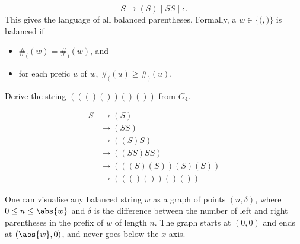 \begin{examples}
\[        S \to (S) \mid SS \mid \epsilon.
    \] This gives the language of all balanced parentheses.
    Formally, a $w \in \{\texttt{(}, \texttt{)}\}$ is balanced if
    \begin{itemize}
        \item $\#_((w) = \#_)(w)$, and
        \item for each prefic $u$ of $w$, $\#_((u) \ge \#_)(u)$.
    \end{itemize}
    \begin{exercise}
        Derive the string $((()())()())$ from $G_4$.
    \end{exercise}
    \begin{solution}
        \begin{align*}
            S &\to (S) \\
            &\to (SS) \\
            &\to ((S)S) \\
            &\to ((SS)SS) \\
            &\to (((S)(S))(S)(S)) \\
            &\to ((()())()())
        \end{align*}
    \end{solution}
    One can visualise any balanced string $w$ as a graph of points
    $(n, \delta)$, where $0 \le n \le \abs{w}$ and $\delta$ is the
    difference between the number of left and right parentheses in the
    prefix of $w$ of length $n$.
    The graph starts at $(0, 0)$ and ends at $(\abs{w}, 0)$,
    and never goes below the $x$-axis.
    \begin{center}
    \end{center}
\end{examples}

